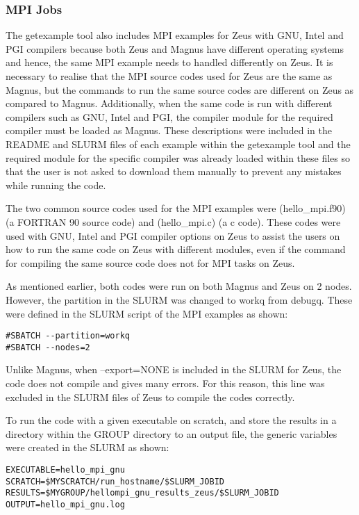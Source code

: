 \documentclass[journal]{IEEEtran}
\begin{document}
\subsubsection{MPI Jobs}

The getexample tool also includes MPI examples for Zeus with GNU, Intel and PGI compilers because both Zeus and Magnus have different operating systems 
and hence, the same MPI example needs to handled differently on Zeus. It is necessary to realise that the MPI source codes used for Zeus are the same
as Magnus, but the commands to run the same source codes are different on Zeus as compared to Magnus. Additionally, when the same code is run 
with different compilers such as GNU, Intel and PGI, the compiler module for the required compiler must be loaded as Magnus. These descriptions were
included in the README and SLURM files of each example within the getexample tool and the required module for the specific compiler was already loaded 
within these files so that the user is not asked to download them manually to prevent any mistakes while running the code.

The two common source codes used for the MPI examples were (hello_mpi.f90) (a FORTRAN 90 source code) and (hello_mpi.c) (a c code). These codes were used 
with GNU, Intel and PGI compiler options on Zeus to assist the users on how to run the same code on Zeus with different modules, even if the command 
for compiling the same source code does not for MPI tasks on Zeus.

As mentioned earlier, both codes were run on both Magnus and Zeus on 2 nodes. However, the partition in the SLURM was changed to workq from debugq.
These were defined in the SLURM script of the MPI examples as shown: 

\begin{verbatim}
#SBATCH --partition=workq
#SBATCH --nodes=2
\end{verbatim}

Unlike Magnus, when --export=NONE is included in the SLURM for Zeus, the code does not compile and gives many errors. For this reason, this line was
excluded in the SLURM files of Zeus to compile the codes correctly.

To run the code with a given executable on scratch, and store the results in a directory within the GROUP directory to an output file, the generic 
variables were created in the SLURM as shown:

\begin{verbatim}
EXECUTABLE=hello_mpi_gnu
SCRATCH=$MYSCRATCH/run_hostname/$SLURM_JOBID
RESULTS=$MYGROUP/hellompi_gnu_results_zeus/$SLURM_JOBID
OUTPUT=hello_mpi_gnu.log
\end{verbatim}
\end{document}
